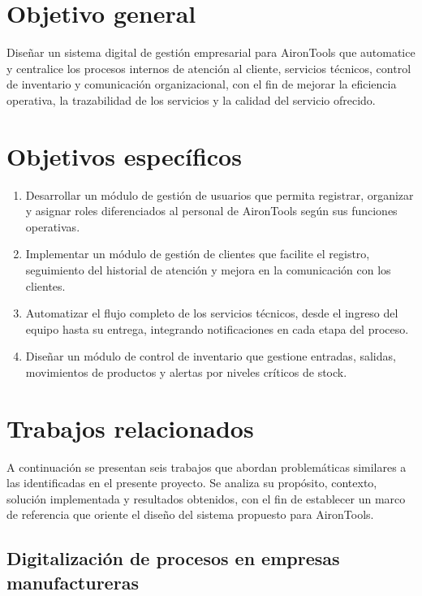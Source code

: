\section{Objetivo general}
Diseñar un sistema digital de gestión empresarial para AironTools que automatice y centralice los procesos internos de atención al cliente, servicios técnicos, control de inventario y comunicación organizacional, con el fin de mejorar la eficiencia operativa, la trazabilidad de los servicios y la calidad del servicio ofrecido.

\section{Objetivos específicos}
\begin{enumerate}
	\item Desarrollar un módulo de gestión de usuarios que permita registrar, organizar y asignar roles diferenciados al personal de AironTools según sus funciones operativas.

	\item Implementar un módulo de gestión de clientes que facilite el registro, seguimiento del historial de atención y mejora en la comunicación con los clientes.

	\item Automatizar el flujo completo de los servicios técnicos, desde el ingreso del equipo hasta su entrega, integrando notificaciones en cada etapa del proceso.

	\item Diseñar un módulo de control de inventario que gestione entradas, salidas, movimientos de productos y alertas por niveles críticos de stock.
\end{enumerate}

\section{Trabajos relacionados}

A continuación se presentan seis trabajos que abordan problemáticas similares a las identificadas en el presente proyecto. Se analiza su propósito, contexto, solución implementada y resultados obtenidos, con el fin de establecer un marco de referencia que oriente el diseño del sistema propuesto para AironTools.

\subsection{Digitalización de procesos en empresas manufactureras \cite{Garcia07}}


